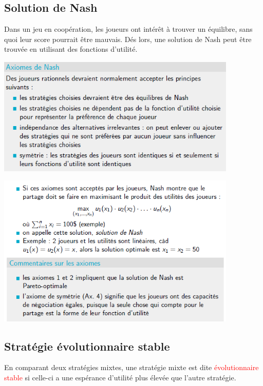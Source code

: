 \documentclass[a4paper, 12pt]{article}
\newcommand{\alinea}{
\hspace*{0.5cm}}
\newcommand{\red}[1]{
	\textcolor{red}{#1}}
\begin{document}
	\subsection{Solution de Nash}
		\alinea Dans un jeu en coopération, les joueurs ont intérêt à trouver un équilibre, sans quoi leur score pourrait être
			mauvais. Dés lors, une solution de Nash peut être trouvée en utilisant des fonctions d'utilité.
		\begin{center}
			\includegraphics[width=4.5in]{Images/axiomes_nash}
		\end{center}
		\begin{center}
			\includegraphics[width=4.5in]{Images/axiomes_nash2}
		\end{center}
	\subsection{Stratégie évolutionnaire stable}
		\alinea En comparant deux stratégies mixtes, une stratégie mixte est dite \red{évolutionnaire stable} si 
			celle-ci a une espérance d'utilité plus élevée que l'autre stratégie.
%
\end{document}
